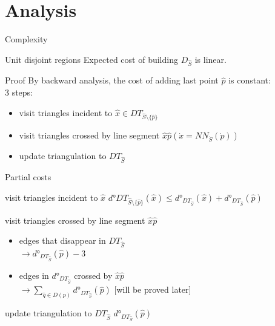 \documentclass{beamer}
\begin{document}
\section{Analysis}
\frame{\tableofcontents[currentsection]}

\begin{frame}{Complexity}

\begin{block}{Unit disjoint regions}
Expected cost of building $D_{\hat{S}}$ is linear.
\end{block}
\begin{block}{Proof}
	By backward analysis, the cost of adding last point $\hat{p}$ is constant:\\
3 steps:
\begin{itemize}
\item visit triangles incident to $\hat{x} \in DT_{\hat{S} \setminus \{\hat{p}\}}$
\item visit triangles crossed by line segment $\hat{x}\hat{p} (\dot{x} = NN_{\dot{S}}(\dot{p}))$
\item update triangulation to $DT_{\hat{S}}$
\end{itemize}
\end{block}
\end{frame}

\begin{frame}{Partial costs}
\begin{block}{visit triangles incident to $\hat{x}$}
\centering
$d°DT_{\hat{S}\setminus\{\hat{p}\}}(\hat{x}) \leq d°_{DT_{\hat{S}}}(\hat{x}) + d°_{DT_{\hat{S}}}(\hat{p})$
\end{block}

\begin{block}{visit triangles crossed by line segment $\hat{x}\hat{p}$}
\begin{itemize}
\item edges that disappear in $DT_{\hat{S}}$ \\
$\rightarrow d°_{DT_{\hat{S}}}(\hat{p}) - 3$\\
\item edges in $d°_{DT_{\hat{S}}}$ crossed by $\hat{x}\hat{p}$\\
$\rightarrow \sum_{\hat{q} \in D(p)}d°_{DT_{\hat{S}}}(\hat{p})$ [will be proved later]
\end{itemize}
\end{block}

\begin{block}{update triangulation to $DT_{\hat{S}}$}
\centering
$d°_{DT_{\hat{S}}}(\hat{p})$
\end{block}

\end{frame}
\end{document}
